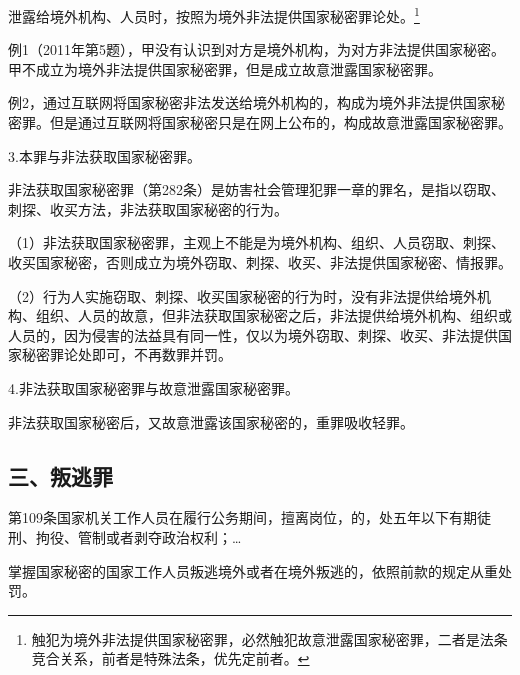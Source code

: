 泄露给境外机构、人员时，按照为境外非法提供国家秘密罪论处。\footnote{触犯为境外非法提供国家秘密罪，必然触犯故意泄露国家秘密罪，二者是法条竞合关系，前者是特殊法条，优先定前者。}

例1（2011年第5题），甲没有认识到对方是境外机构，为对方非法提供国家秘密。甲不成立为境外非法提供国家秘密罪，但是成立故意泄露国家秘密罪。

例2，通过互联网将国家秘密非法发送给境外机构的，构成为境外非法提供国家秘密罪。但是通过互联网将国家秘密只是在网上公布的，构成故意泄露国家秘密罪。

3.本罪与非法获取国家秘密罪。

非法获取国家秘密罪（第282条）是妨害社会管理犯罪一章的罪名，是指以窃取、刺探、收买方法，非法获取国家秘密的行为。

（1）非法获取国家秘密罪，主观上不能是为境外机构、组织、人员窃取、刺探、收买国家秘密，否则成立为境外窃取、刺探、收买、非法提供国家秘密、情报罪。

（2）行为人实施窃取、刺探、收买国家秘密的行为时，没有非法提供给境外机构、组织、人员的故意，但非法获取国家秘密之后，非法提供给境外机构、组织或人员的，因为侵害的法益具有同一性，仅以为境外窃取、刺探、收买、非法提供国家秘密罪论处即可，不再数罪并罚。

4.非法获取国家秘密罪与故意泄露国家秘密罪。

非法获取国家秘密后，又故意泄露该国家秘密的，重罪吸收轻罪。

\subsection*{三、叛逃罪}

第109条国家机关工作人员在履行公务期间，擅离岗位，的，处五年以下有期徒刑、拘役、管制或者剥夺政治权利；…

掌握国家秘密的国家工作人员叛逃境外或者在境外叛逃的，依照前款的规定从重处罚。

